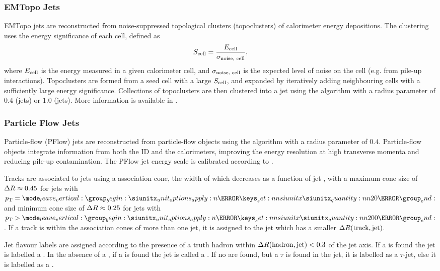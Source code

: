 \subsubsection{EMTopo Jets}
EMTopo jets are reconstructed from noise-suppressed topological clusters (topoclusters) of calorimeter energy depositions.
The clustering uses the energy significance of each cell, defined as 
%
\begin{equation}
  S_\textnormal{cell} = \frac{E_\textnormal{cell}}{\sigma_\textnormal{noise, cell}} ,
\end{equation}
%
where $E_\textnormal{cell}$ is the energy measured in a given calorimeter cell, and $\sigma_\textnormal{noise, cell}$ is the expected level of noise on the cell (e.g. from pile-up interactions).
Topoclusters are formed from a seed cell with a large $S_\textnormal{cell}$, and expanded by iteratively adding neighbouring cells with a sufficiently large energy significance.
Collections of topoclusters are then clustered into a jet 
using the \antikt algorithm with a radius parameter of $0.4$ (\smallR jets) or $1.0$ (\largeR jets).
More information is available in .


\subsubsection{Particle Flow Jets}
Particle-flow (PFlow) jets are reconstructed from particle-flow objects \cite{PERF-2015-09} using the \antikt algorithm with a radius parameter of $0.4$.
Particle-flow objects integrate information from both the ID and the calorimeters, improving the energy resolution at high transverse momenta and reducing pile-up contamination.
The PFlow jet energy scale is calibrated according to .

Tracks are associated to jets using a \DeltaR association cone, the width of which decreases as a function of jet \pt, with a maximum cone size of $\Delta R \approx 0.45$ for jets with $\pt = \SI{20}{\GeV}$ and minimum cone size of $\Delta R \approx 0.25$ for jets with $\pt > \SI{200}{\GeV}$. 
If a track is within the association cones of more than one jet, it is assigned to the jet which has a smaller $\Delta R(\text{track}, \text{jet})$.

Jet flavour labels are assigned according to the presence of a truth hadron within ${\Delta R(\text{hadron},\text{jet})<0.3}$ of the jet axis. If a \bhadron is found the jet is labelled a \bjet. In the absence of a \bhadron, if a \chadron is found the jet is called a \cjet.
If no \borchadrons are found, but a $\tau$ is found in the jet, it is labelled as a $\tau$-jet, else it is labelled as a \ljet.

